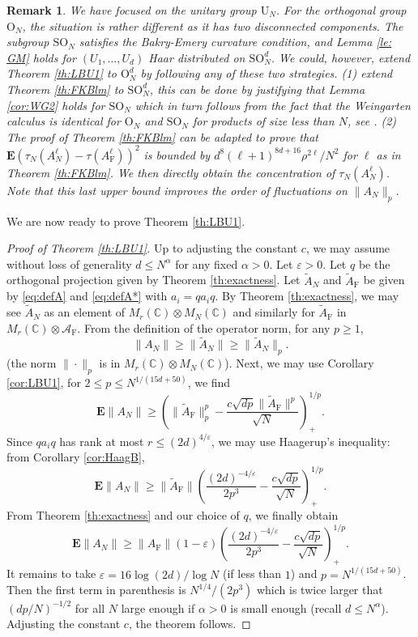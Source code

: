 \documentclass[11pt]{article}
\renewcommand{\star}{{\mathrm{F}}}
\newtheorem{remark}[lemma]{Remark}
\newcommand{\cA}{\mathcal{A}}
\newcommand{\dE}{\mathbf {E}}
\newcommand{\dU}{\mathrm {U}}
\newcommand{\dO}{\mathrm{O}}
\newcommand{\dSO}{\mathrm{SO}}
\newcommand{\dC}{\mathbb {C}}
\newcommand{\PAR}[1]{{{\left(#1\right)}}} %
\newcommand{\1}{1\!\!{\sf I}}
\newcommand{\veps}{\varepsilon}
\begin{document}
\begin{remark}\label{rk:HaarON}
We have focused on the unitary group $\dU_N$. For the orthogonal group $\dO_N$, the situation is rather different as it has two disconnected components. The subgroup $\dSO_N$ satisfies the Bakry-Emery curvature condition, and Lemma \ref{le: GM} holds for $(U_1,\ldots,U_d)$ Haar distributed on $\dSO_N^d$. We could, however, extend Theorem \ref{th:LBU1} to $\dO_N^d$ by following any of these two strategies. (1) extend Theorem \ref{th:FKBlm} to $\dSO_N^d$, this can be done by justifying that Lemma \ref{cor:WG2} holds for $\dSO_N$ which in turn follows from the fact that the Weingarten calculus is identical for $\dO_N$ and $\dSO_N$ for products of size less than $N$, see \cite{collins2021weingarten}. (2) The proof of Theorem \ref{th:FKBlm} can be adapted to prove that $\dE ( \tau_N (A_N^\ell) - \tau(A_\star^\ell) )^2 $ is bounded by $d^8 (\ell +1)^{8d +16} \rho^{2 \ell} / N^2$ for $\ell$ as in Theorem \ref{th:FKBlm}. We then directly obtain the concentration of $\tau_N (A_N^\ell) $. Note that this last upper bound improves the order of fluctuations on $\| A_N\|_p$.  
\end{remark}

We are now ready to prove Theorem \ref{th:LBU1}. 

\begin{proof}[Proof of Theorem \ref{th:LBU1}]
Up to adjusting the constant $c$, we may assume without loss of generality $d \leq N^{\alpha}$ for any fixed $\alpha >0$.  Let $\veps > 0$. Let $q$ be the orthogonal projection given by Theorem \ref{th:exactness}. Let $\tilde A_N$ and $\tilde A_\star$ be given by \eqref{eq:defA} and \eqref{eq:defA*} with $a_i = q a_i q$. By Theorem \ref{th:exactness}, we may see $\tilde A_N$ as an element of $M_r(\dC) \otimes M_N(\dC)$ and similarly for $\tilde A_\star$ in $M_r(\dC) \otimes \cA_\star$. From the definition of the operator norm, for any $p \geq 1$,
$$
\| A_N \| \geq \| \tilde A_N\| \geq \| \tilde A_N\| _p.
$$
(the norm $\| \cdot \|_p$ is in $M_r(\dC) \otimes M_N(\dC)$). Next, we may use Corollary \ref{cor:LBU1}, for $2 \leq p \leq N^{1/(15d + 50)}$, we find
 $$
 \dE \| A_N \| \geq  \PAR{ \|\tilde A_\star\|^p_p  -  \frac{ c \sqrt{d p } \| \tilde A _\star \|^p }{\sqrt N } }_+^{1/p}.
$$
Since $q a_i q$ has rank at most $r \leq (2d)^{4/ \veps}$,   we may use Haagerup's inequality: from Corollary \ref{cor:HaagB}, 
$$
 \dE \| A_N \| \geq  \| \tilde A_\star \| \PAR{ \frac{(2d)^{-4 / \veps}}{2 p^3}   -  \frac{ c \sqrt{d p }  }{\sqrt N } }_+^{1/p}.
$$
From Theorem \ref{th:exactness} and our choice of $q$, we finally obtain 
$$
 \dE \| A_N \| \geq  \| A_\star \| (1- \veps) \PAR{ \frac{(2d)^{-4 / \veps}}{2 p^3}   -  \frac{ c \sqrt{d p }  }{\sqrt N } }_+^{1/p}.
$$
It remains to take $\veps = 16 \log (2d) / \log N$ (if less than $1$) and $p =  N^{1/(15d + 50)}$. Then the first term in parenthesis is  $N^{1/4}/(2 p^{3})$ which is twice larger that $(dp/N)^{-1/2}$ for all $N$ large enough if $\alpha >0$ is small enough (recall $d \leq N^{\alpha}$).  Adjusting the constant $c$, the theorem follows. 
\end{proof}
\end{document}
